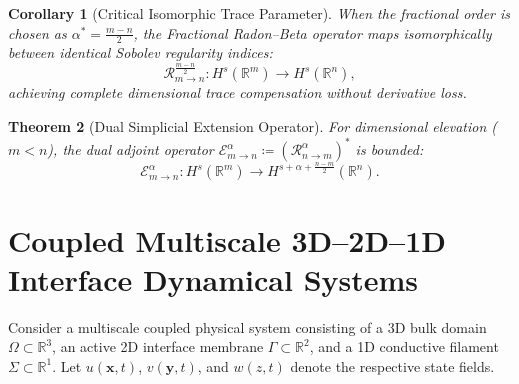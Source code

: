 \documentclass[11pt,a4paper]{article}
\theoremstyle{plain}
\newtheorem{theorem}{Theorem}[section]
\newtheorem{corollary}[theorem]{Corollary}
\theoremstyle{definition}
\theoremstyle{remark}
\numberwithin{equation}{section}
\begin{document}
\begin{corollary}[Critical Isomorphic Trace Parameter]
When the fractional order is chosen as $\alpha^* = \frac{m-n}{2}$, the Fractional Radon--Beta operator maps isomorphically between identical Sobolev regularity indices:
\begin{equation}
\mathcal{R}_{m \to n}^{\frac{m-n}{2}} : H^s(\mathbb{R}^m) \longrightarrow H^s(\mathbb{R}^n),
\end{equation}
achieving complete dimensional trace compensation without derivative loss.
\end{corollary}

\begin{theorem}[Dual Simplicial Extension Operator]
For dimensional elevation ($m < n$), the dual adjoint operator $\mathcal{E}_{m \to n}^\alpha \coloneqq (\mathcal{R}_{n \to m}^\alpha)^*$ is bounded:
\begin{equation}
\mathcal{E}_{m \to n}^\alpha : H^s(\mathbb{R}^m) \longrightarrow H^{s + \alpha + \frac{n-m}{2}}(\mathbb{R}^n).
\end{equation}
\end{theorem}

\section{Coupled Multiscale 3D--2D--1D Interface Dynamical Systems}

Consider a multiscale coupled physical system consisting of a 3D bulk domain $\Omega \subset \mathbb{R}^3$, an active 2D interface membrane $\Gamma \subset \mathbb{R}^2$, and a 1D conductive filament $\Sigma \subset \mathbb{R}^1$. Let $u(\mathbf{x}, t)$, $v(\mathbf{y}, t)$, and $w(z, t)$ denote the respective state fields.
\end{document}
